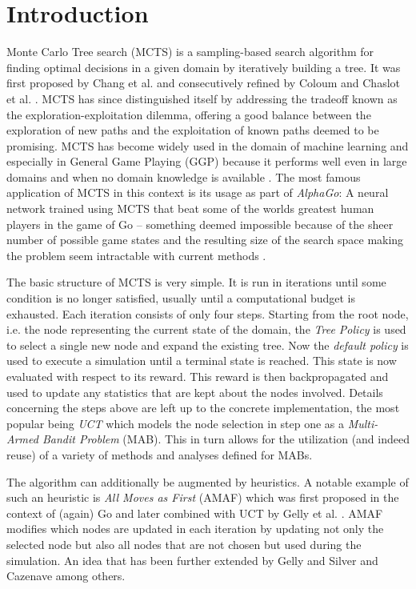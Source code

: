\section{Introduction}
Monte Carlo Tree search (MCTS) is a sampling-based search algorithm for finding optimal decisions in a given domain by iteratively building a tree. It was first proposed by Chang et al. \cite{chang2005adaptive} and consecutively refined by Coloum \cite{coulom2006efficient} and Chaslot et al. \cite{chaslot2008monte}. MCTS has since distinguished itself by addressing the tradeoff known as the exploration-exploitation dilemma, offering a good balance between the exploration of new paths and the exploitation of known paths deemed to be promising. MCTS has become widely used in the domain of machine learning and especially in General Game Playing (GGP) because it performs well even in large domains and when no domain knowledge is available \cite{sironi2019comparing}. The most famous application of MCTS in this context is its usage as part of \textit{AlphaGo}: A neural network trained using MCTS that beat some of the worlds greatest human players in the game of Go -- something deemed impossible because of the sheer number of possible game states and the resulting size of the search space making the problem seem intractable with current methods \cite{silver2017mastering}.

The basic structure of MCTS is very simple. It is run in iterations until some condition is no longer satisfied, usually until a computational budget is exhausted. Each iteration consists of only four steps. Starting from the root node, i.e. the node representing the current state of the domain, the \textit{Tree Policy} is used to select a single new node and expand the existing tree. Now the \textit{default policy} is used to execute a simulation until a terminal state is reached. This state is now evaluated with respect to its reward. This reward is then backpropagated and used to update any statistics that are kept about the nodes involved. Details concerning the steps above are left up to the concrete implementation, the most popular being \textit{UCT} which models the node selection in step one as a \textit{Multi-Armed Bandit Problem} (MAB). This in turn allows for the utilization (and indeed reuse) of a variety of methods and analyses defined for MABs.

The algorithm can additionally be augmented by heuristics. A notable example of such an heuristic is \textit{All Moves as First} (AMAF) which was first proposed in the context of (again) Go and later combined with UCT by Gelly et al. \cite{gelly2007combining}. AMAF modifies which nodes are updated in each iteration by updating not only the selected node but also all nodes that are not chosen but used during the simulation. An idea that has been further extended by Gelly and Silver \cite{gelly2011monte} and Cazenave \cite{cazenave2015generalized} among others.

